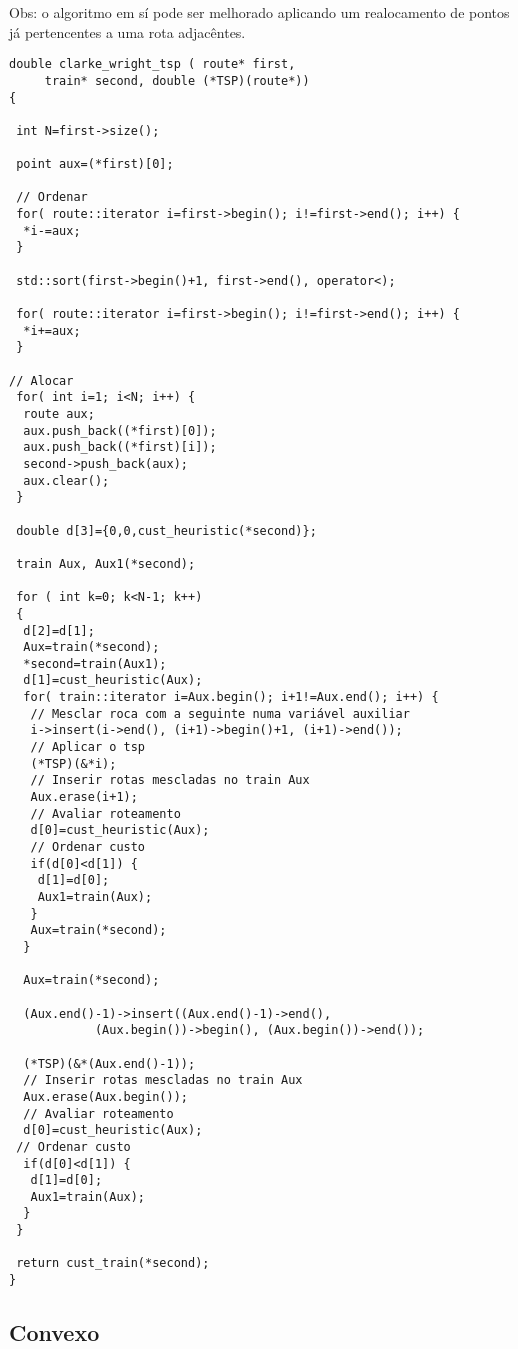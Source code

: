 \documentclass[a4paper, 12pt]{article}
\begin{document}
Obs: o algoritmo em sí pode ser melhorado aplicando um realocamento de pontos já
pertencentes a uma rota adjacêntes.


{\small
\begin{verbatim}
double clarke_wright_tsp ( route* first,
	 train* second, double (*TSP)(route*))
{

 int N=first->size();

 point aux=(*first)[0];

 // Ordenar
 for( route::iterator i=first->begin(); i!=first->end(); i++) {
  *i-=aux;
 }

 std::sort(first->begin()+1, first->end(), operator<);

 for( route::iterator i=first->begin(); i!=first->end(); i++) {
  *i+=aux;
 }

// Alocar
 for( int i=1; i<N; i++) {
  route aux;
  aux.push_back((*first)[0]);
  aux.push_back((*first)[i]);
  second->push_back(aux);
  aux.clear();
 }

 double d[3]={0,0,cust_heuristic(*second)};

 train Aux, Aux1(*second);

 for ( int k=0; k<N-1; k++)
 {
  d[2]=d[1];
  Aux=train(*second);
  *second=train(Aux1);
  d[1]=cust_heuristic(Aux);
  for( train::iterator i=Aux.begin(); i+1!=Aux.end(); i++) {
   // Mesclar roca com a seguinte numa variável auxiliar
   i->insert(i->end(), (i+1)->begin()+1, (i+1)->end());
   // Aplicar o tsp
   (*TSP)(&*i);
   // Inserir rotas mescladas no train Aux
   Aux.erase(i+1);
   // Avaliar roteamento
   d[0]=cust_heuristic(Aux);
   // Ordenar custo
   if(d[0]<d[1]) {
    d[1]=d[0];
    Aux1=train(Aux);
   }
   Aux=train(*second);
  }

  Aux=train(*second);
  
  (Aux.end()-1)->insert((Aux.end()-1)->end(), 
			(Aux.begin())->begin(), (Aux.begin())->end());

  (*TSP)(&*(Aux.end()-1));
  // Inserir rotas mescladas no train Aux
  Aux.erase(Aux.begin());
  // Avaliar roteamento
  d[0]=cust_heuristic(Aux);
 // Ordenar custo
  if(d[0]<d[1]) {
   d[1]=d[0];
   Aux1=train(Aux);
  }
 }

 return cust_train(*second);
}
\end{verbatim}
}


\newpage


\subsection{Convexo}
\end{document}
